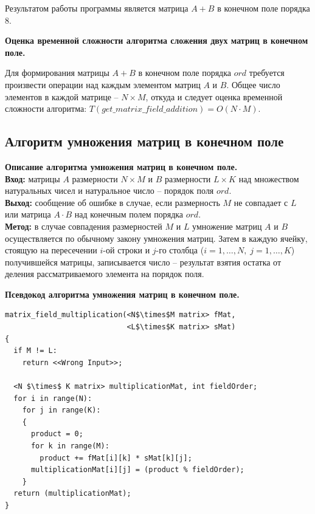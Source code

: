 \documentclass[spec, och, otchet, hidelinks]{SCWorks}
\newcommand{\tbf}[1]{\textbf{#1}}
\begin{document}
\par Результатом работы программы является матрица $A + B$ в конечном поле
порядка 8. \\

\par \tbf{Оценка временной сложности алгоритма сложения двух матриц в конечном
  поле.}

\par Для формирования матрицы $A + B$ в конечном поле порядка $ord$ требуется
произвести операции над каждым элементом матриц $A$ и $B$. Общее число
элементов в каждой матрице -- $N \times M$, откуда и следует оценка временной
сложности алгоритма: $T(get\_matrix\_field\_addition) = O(N \cdot M)$.

\newpage

\subsection{Алгоритм умножения матриц в конечном поле}
\par \tbf{Описание алгоритма умножения матриц в конечном поле.} \\
\tbf{Вход:} матрицы $A$ размерности $N \times M$ и $B$ размерности $L \times K$
над множеством натуральных чисел и натуральное число -- порядок поля $ord$. \\
\tbf{Выход:} сообщение об ошибке в случае, если размерность $M$ не совпадает с
$L$ или матрица $A \cdot B$ над конечным полем порядка $ord$. \\
\tbf{Метод:} в случае совпадения размерностей $M$ и $L$ умножение матриц $A$ и
$B$ осуществляется по обычному закону умножения матриц. Затем в каждую ячейку,
стоящую на пересечении $i$-ой строки и
$j$-го столбца ($i = 1,\dots,N, \; j = 1,\dots,K$) получившейся матрицы, записывается число
-- результат взятия остатка от деления рассматриваемого элемента на порядок поля.

\par \tbf{Псевдокод алгоритма умножения матриц в конечном поле.}
\begin{lstlisting}[caption=Псевдокод алгоритма., mathescape]
matrix_field_multiplication(<N$\times$M matrix> fMat,
                            <L$\times$K matrix> sMat)
{
  if M != L:
    return <<Wrong Input>>;

  <N $\times$ K matrix> multiplicationMat, int fieldOrder;
  for i in range(N):
    for j in range(K):
    {
      product = 0;
      for k in range(M):
        product += fMat[i][k] * sMat[k][j];
      multiplicationMat[i][j] = (product % fieldOrder);
    }
  return (multiplicationMat);
}
\end{lstlisting}
\end{document}
